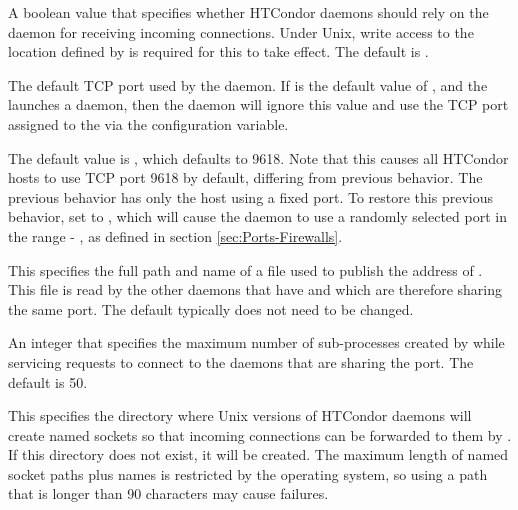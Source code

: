 \begin{description}

\label{param:UseSharedPort}
\item[\Macro{USE\_SHARED\_PORT}] A boolean value that
  specifies whether HTCondor daemons should rely on the
   daemon for receiving incoming connections.  
  Under Unix, write access to the location defined by 
   is required for this to take effect.
  The default is .

\label{param:SharedPortPort}
\item[\Macro{SHARED\_PORT\_PORT}]
  The default TCP port used by the  daemon.
  If  is the default value 
  of ,
  and the  launches a  daemon,
  then the  daemon will ignore this value 
  and use the TCP port assigned to the  
  via the  configuration variable.

  The default value is , which defaults to 9618.  
  Note that this causes all HTCondor hosts to use TCP port 9618 by default, 
  differing from previous behavior.
  The previous behavior has only the  host using a fixed port.
  To restore this previous behavior, 
  set  to ,
  which will cause the  daemon
  to use a randomly selected port in the range
   - ,
  as defined in section \ref{sec:Ports-Firewalls}.

\label{param:SharedPortDaemonAdFile}
\item[\Macro{SHARED\_PORT\_DAEMON\_AD\_FILE}]
  This specifies the full path and name of a file used to publish the
  address of .  This file is read by the other
  daemons that have  and which are therefore
  sharing the same port.  The default typically does not need to be changed.

\label{param:SharedPortMaxWorkers}
\item[\Macro{SHARED\_PORT\_MAX\_WORKERS}] An integer that specifies
 the maximum number of sub-processes created by 
 while servicing requests to connect to the daemons that are sharing the port.
 The default is 50.

\label{param:DaemonSocketDir}
\item[\Macro{DAEMON\_SOCKET\_DIR}] This specifies the directory where
  Unix versions of HTCondor daemons will create named sockets so that incoming
  connections can be forwarded to them by .  If
  this directory does not exist, it will be created. The maximum length
  of named socket paths plus names is restricted by the operating system,
  so using a path that is longer than 90 characters may cause failures.


\end{description}
